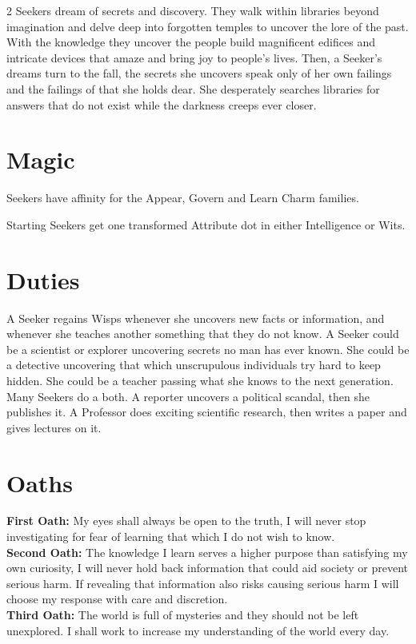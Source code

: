 \begin{multicols}{2}
Seekers dream of secrets and discovery. They walk within libraries beyond imagination and delve deep into forgotten temples to uncover the lore of the past. With the knowledge they uncover the people build magnificent edifices and intricate devices that amaze and bring joy to people's lives. Then, a Seeker's dreams turn to the fall, the secrets she uncovers speak only of her own failings and the failings of that she holds dear. She desperately searches libraries for answers that do not exist while the darkness creeps ever closer. 

\section*{Magic}

Seekers have affinity for the Appear, Govern and Learn Charm families.

Starting Seekers get one transformed Attribute dot in either Intelligence or Wits. 

\section*{Duties}

A Seeker regains Wisps whenever she uncovers new facts or information, and whenever she teaches another something that they do not know. A Seeker could be a scientist or explorer uncovering secrets no man has ever known. She could be a detective uncovering that which unscrupulous individuals try hard to keep hidden. She could be a teacher passing what she knows to the next generation. Many Seekers do a both. A reporter uncovers a political scandal, then she publishes it. A Professor does exciting scientific research, then writes a paper and gives lectures on it. 

\section*{Oaths}
\noindent \textbf{First Oath:} My eyes shall always be open to the truth, I will never stop investigating for fear of learning that which I do not wish to know. \\
\noindent \textbf{Second Oath:} The knowledge I learn serves a higher purpose than satisfying my own curiosity, I will never hold back information that could aid society or prevent serious harm. If revealing that information also risks causing serious harm I will choose my response with care and discretion.  \\
\noindent \textbf{Third Oath:} The world is full of mysteries and they should not be left unexplored. I shall work to increase my understanding of the world every day.



\end{multicols}

